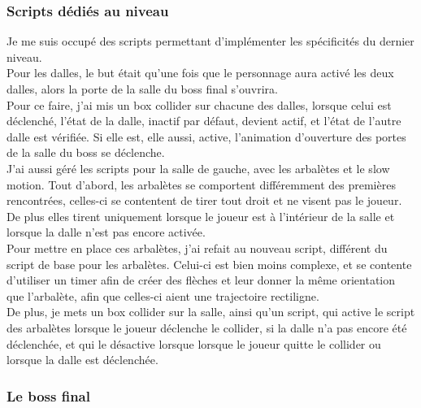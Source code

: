 \documentclass[12pt]{article}
\begin{document}
\subsubsection{Scripts dédiés au niveau}

Je me suis occupé des scripts permettant d'implémenter les spécificités du dernier niveau.\\
Pour les dalles, le but était qu'une fois que le personnage aura activé les deux dalles, alors la porte de la salle du boss final s'ouvrira.\\
Pour ce faire, j'ai mis un box collider sur chacune des dalles, lorsque celui est déclenché, l'état de la dalle, inactif par défaut, devient actif, et l'état de l'autre dalle est vérifiée. Si elle est, elle aussi, active, l'animation d'ouverture des portes de la salle du boss se déclenche.\\

J'ai aussi géré les scripts pour la salle de gauche, avec les arbalètes et le slow motion. Tout d'abord, les arbalètes se comportent différemment des premières rencontrées, celles-ci se contentent de tirer tout droit et ne visent pas le joueur. De plus elles tirent uniquement lorsque le joueur est à l'intérieur de la salle et lorsque la dalle n'est pas encore activée.\\
Pour mettre en place ces arbalètes, j'ai refait au nouveau script, différent du script de base pour les arbalètes. Celui-ci est bien moins complexe, et se contente d'utiliser un timer afin de créer des flèches et leur donner la même orientation que l'arbalète, afin que celles-ci aient une trajectoire rectiligne.\\
De plus, je mets un box collider sur la salle, ainsi qu'un script, qui active le script des arbalètes lorsque le joueur déclenche le collider, si la dalle n'a pas encore été déclenchée, et qui le désactive lorsque lorsque le joueur quitte le collider ou lorsque la dalle est déclenchée.

\subsubsection{Le boss final}
\end{document}
